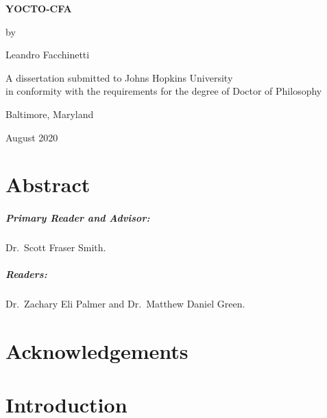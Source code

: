 \documentclass[12pt, oneside]{book}
\begin{document}
\frontmatter

\begin{center}
\begin{singlespace}
\vspace*{0.5in}

\textbf{\uppercase{Yocto-CFA}}

\vspace*{1in}

by

Leandro Facchinetti

\vspace*{1.5in}

A dissertation submitted to Johns Hopkins University\\in conformity with the requirements for the degree of Doctor of Philosophy

\vspace*{0.5in}

Baltimore, Maryland

August 2020
\end{singlespace}
\end{center}

\thispagestyle{empty}
\clearpage

\chapter{Abstract}


\paragraph{Primary Reader and Advisor:}

Dr.~Scott Fraser Smith.

\paragraph{Readers:}

Dr.~Zachary Eli Palmer and Dr.~Matthew Daniel Green.

\chapter{Acknowledgements}


\tableofcontents
\listoftables
\listoffigures

\mainmatter

\chapter{Introduction}
\end{document}
